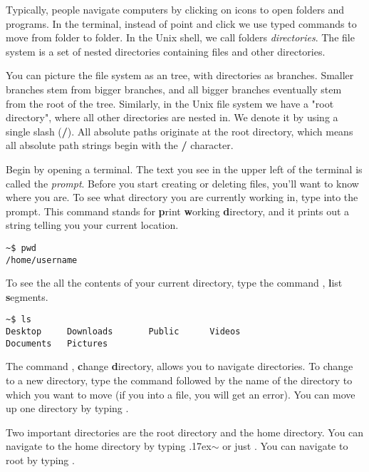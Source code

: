 Typically, people navigate computers by clicking on icons to open folders and programs.
In the terminal, instead of point and click we use typed commands to move from folder to folder.
In the Unix shell, we call folders \emph{directories}.
The file system is a set of nested directories containing files and other directories.

You can picture the file system as an tree, with directories as branches. Smaller branches stem from bigger branches, and all bigger branches eventually stem from the root of the tree. Similarly, in the Unix file system we have a "root directory", where all other directories are nested in. We denote it by using a single slash (\textbf{/}). All absolute paths originate at the root directory, which means all absolute path strings begin with the \textbf{/} character.

Begin by opening a terminal.
The text you see in the upper left of the terminal is called the \emph{prompt}.
Before you start creating or deleting files, you'll want to know where you are.
To see what directory you are currently working in, type  into the prompt.
This command stands for \textbf{p}rint \textbf{w}orking \textbf{d}irectory, and it prints out a string telling you your current location.

\begin{lstlisting}
~$ pwd
/home/username
\end{lstlisting}

To see the all the contents of your current directory, type the command , \textbf{l}ist \textbf{s}egments.

\begin{lstlisting}
~$ ls
Desktop		Downloads		Public 		Videos
Documents 	Pictures
\end{lstlisting}

The command , \textbf{c}hange \textbf{d}irectory, allows you to navigate directories.
To change to a new directory, type the  command followed by the name of the directory to which you want to move (if you  into a file, you will get an error).
You can move up one directory by typing .

Two important directories are the root directory and the home directory.
You can navigate to the home directory by typing  \raise.17ex\hbox{$\scriptstyle\sim$} or just .
You can navigate to root by typing .

